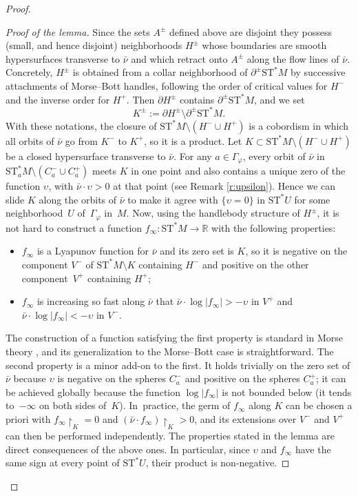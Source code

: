 \documentclass[JEP,XML,SOM,Unicode]{cedram}
\newcommand{\R}{{\mathbb R}}
\newcommand{\Crit}{\Gamma_{\!\varphi}}
\newcommand{\sST}{\mathrm{ST}^\ast}
\newcommand{\cnu}{\bar\nu}
\newcommand{\de}{\mathrel{:=}}
\newcommand{\rst}[1]{{\upharpoonright}_{\!#1}}
\let\del\partial
\let\on\colon
\let\ups\upsilon
\theoremstyle{plain}
\theoremstyle{definition}
\begin{document}
\begin{proof}
\begin{proof}[Proof of the lemma]
Since the sets $A^\pm$ defined above are disjoint they possess (small, and hence
disjoint) neighborhoods $H^\pm$ whose boundaries are smooth hypersurfaces
transverse to $\cnu$ and which retract onto $A^\pm$ along the flow lines of
$\cnu$. Concretely, $H^\pm$ is obtained from a collar neighborhood of $\del^\pm
\sST M$ by successive attachments of Morse--Bott handles, following the order
of critical values for $H^-$ and the inverse order for $H^+$. Then $\del H^\pm$
contains $\del^\pm \sST M$, and we set
\[
K^\pm \de \del H^\pm \setminus\del^\pm \sST M.
\]
With these notations, the closure of $\sST M \setminus (H^- \cup H^+)$ is a cobordism in
which all orbits of $\cnu$ go from $K^-$ to $K^+$, so it is a product. Let \hbox{$K
\subset \sST M \setminus (H^- \cup H^+)$} be a closed hypersurface transverse to $\cnu$.
For any $a \in \Crit$, every orbit of $\cnu$ in \hbox{$\sST_aM \setminus (C_a^- \cup C_a^+)$}
meets $K$ in one point and also contains a unique zero of the function $\ups$,
with $\cnu \cdot \ups > 0$ at that point (see Remark \ref{r:upsilon}). Hence we
can slide $K$ along the orbits of $\cnu$ to make it agree with $\{\ups=0\}$ in
$\sST U$ for some neighborhood~$U$ of~$\Crit$ in~$M$. Now, using the handlebody
structure of $H^\pm$, it is not hard to construct a function $f_\infty \on
\sST M \to \R$ with the following properties:
\begin{itemize}
\item
$f_\infty$ is a Lyapunov function for $\cnu$ and its zero set is $K$, so it is
negative on the component $V^-$ of $\sST M \setminus K$ containing $H^-$ and positive on
the other component~$V^+$ containing $H^+$;
\item
$f_\infty$ is increasing so fast along $\cnu$ that $\cnu \cdot \log|f_\infty| >
-\ups$ in $V^+$ and $\cnu \cdot \log|f_\infty| < -\ups$ in $V^-$.
\end{itemize}
The construction of a function satisfying the first property is standard in
Morse theory \cite{Sm}, and its generalization to the Morse--Bott case is
straightforward. The second property is a minor add-on to the first. It holds
trivially on the zero set of $\cnu$ because $\ups$ is negative on the spheres
$C_a^-$ and positive on the spheres $C_a^+$; it can be achieved globally because
the function $\log|f_\infty|$ is not bounded below (it tends to~$-\infty$ on
both sides of~$K$). In~practice, the germ of $f_\infty$ along $K$ can be chosen a priori with $f_\infty \rst K = 0$ and $(\cnu \cdot f_\infty) \rst K >
0$, and its extensions over $V^-$ and $V^+$ can then be performed independently.
The properties stated in the lemma are direct consequences of the above ones. In
particular, since $\ups$ and $f_\infty$ have the same sign at every point of
$\sST U$, their product is non-negative.
\end{proof}


\end{proof}
\end{document}
